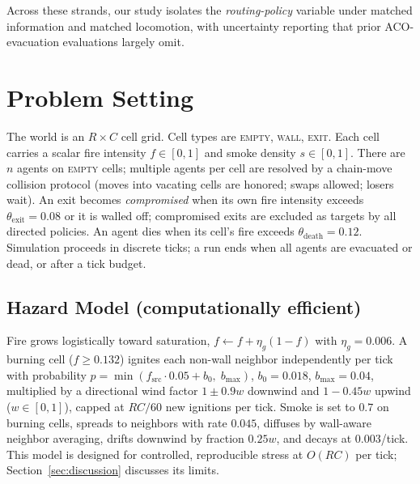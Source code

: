 ﻿\documentclass[conference]{IEEEtran}
\begin{document}
Across these strands, our study isolates the \emph{routing-policy} variable under matched information and matched locomotion, with uncertainty reporting that prior ACO-evacuation evaluations largely omit.

\section{Problem Setting}
The world is an $R\times C$ cell grid. Cell types are \textsc{empty}, \textsc{wall}, \textsc{exit}. Each cell carries a scalar fire intensity $f\in[0,1]$ and smoke density $s\in[0,1]$. There are $n$ agents on \textsc{empty} cells; multiple agents per cell are resolved by a chain-move collision protocol (moves into vacating cells are honored; swaps allowed; losers wait). An exit becomes \emph{compromised} when its own fire intensity exceeds $\theta_{\mathrm{exit}}{=}0.08$ or it is walled off; compromised exits are excluded as targets by all directed policies. An agent dies when its cell's fire exceeds $\theta_{\mathrm{death}}{=}0.12$. Simulation proceeds in discrete ticks; a run ends when all agents are evacuated or dead, or after a tick budget.

\subsection{Hazard Model (computationally efficient)}
Fire grows logistically toward saturation, $f\!\leftarrow\!f+\eta_g(1{-}f)$ with $\eta_g{=}0.006$. A burning cell ($f\geq0.132$) ignites each non-wall neighbor independently per tick with probability $p=\min(f_{\mathrm{src}}\cdot0.05+b_0,\;b_{\max})$, $b_0{=}0.018$, $b_{\max}{=}0.04$, multiplied by a directional wind factor $1\pm0.9w$ downwind and $1-0.45w$ upwind ($w\in[0,1]$), capped at $RC/60$ new ignitions per tick. Smoke is set to $0.7$ on burning cells, spreads to neighbors with rate $0.045$, diffuses by wall-aware neighbor averaging, drifts downwind by fraction $0.25w$, and decays at $0.003$/tick. This model is designed for controlled, reproducible stress at $O(RC)$ per tick; Section~\ref{sec:discussion} discusses its limits.
\end{document}
